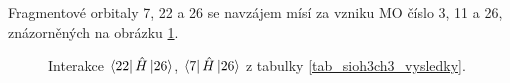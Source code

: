 \documentclass[
  digital, %
  table,   %
  lof,     %
  lot,     %
]{fithesis3}
\begin{document}
Fragmentové orbitaly  7, 22 a 26 se navzájem mísí za vzniku MO číslo 3, 11 a 26, znázorněných na obrázku \ref{obr_sioh3ch3_vysledky_I}.   
\begin{figure}
\begin{center}
\caption{Interakce $\bra{22}{\hat{H}}\ket{26}$, $\bra{7}{\hat{H}}\ket{26}$  z tabulky \ref{tab_sioh3ch3_vysledky}.}

\label{obr_sioh3ch3_vysledky_I}\end{center}
\end{figure} 
\end{document}
